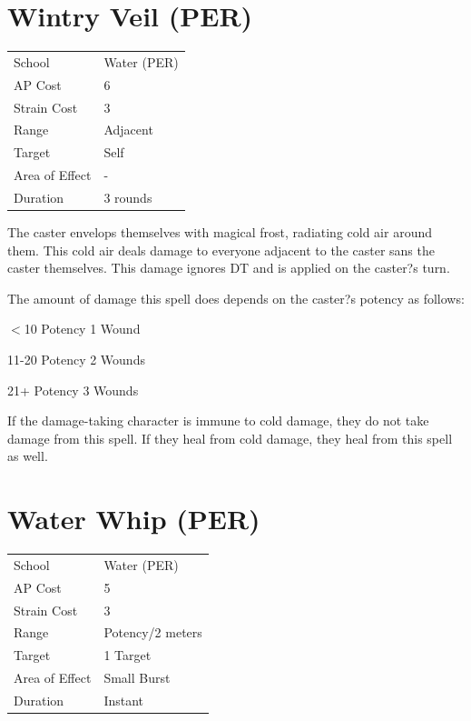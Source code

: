 \documentclass[11pt,a4paper,twocolumn]{book}
\begin{document}
				\section*{Wintry Veil (PER)}
	{
		\begin{tabu} to 75mm{| X[l,4] | X[l,7] |}
			\hline
			School 			&  Water (PER)			\\
			AP Cost	      	&  6					\\
			Strain Cost     &  3					\\
			Range     		&  Adjacent				\\
			Target      	&  Self					\\
			Area of Effect  &  -	 				\\
			Duration     	&  3 rounds				\\ \hline
		\end{tabu}
		
	}
	
	\medskip
	
	The caster envelops themselves with magical frost, radiating cold air around them. This cold air deals damage to everyone adjacent to the caster sans the caster themselves. This damage ignores DT and is applied on the caster?s turn.
	
	The amount of damage this spell does depends on the caster?s potency as follows:
	
	\begin{compactitem}
		\item $<$10 Potency 		1 Wound
		\item 11-20 Potency 		2 Wounds
		\item 21+ Potency 			3 Wounds
	\end{compactitem}
	
	If the damage-taking character is immune to cold damage, they do not take damage from this spell. If they heal from cold damage, they heal from this spell as well.
	
					\section*{Water Whip (PER)}
	{
		\begin{tabu} to 75mm{| X[l,4] | X[l,7] |}
			\hline
			School 			&  Water (PER)			\\
			AP Cost	      	&  5					\\
			Strain Cost     &  3					\\
			Range     		&  Potency/2 meters		\\
			Target      	&  1 Target				\\
			Area of Effect  &  Small Burst	 		\\
			Duration     	&  Instant				\\ \hline
		\end{tabu}
		
	}
	
\end{document}
